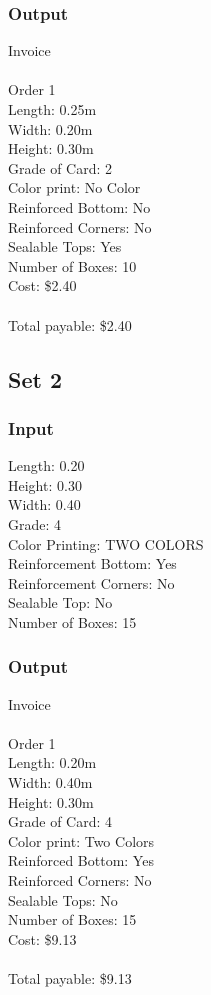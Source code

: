\documentclass[12pt]{article}
\begin{document}
\subsubsection{Output}
Invoice\\
\\
Order 1\\
Length: 0.25m\\
Width: 0.20m\\
Height: 0.30m\\
Grade of Card: 2\\
Color print: No Color\\
Reinforced Bottom: No\\
Reinforced Corners: No\\
Sealable Tops: Yes\\
Number of Boxes: 10\\
Cost: \$2.40\\
\\
Total payable: \$2.40\\
\subsection{Set 2}
\subsubsection{Input}
Length: 0.20\\
Height: 0.30\\
Width: 0.40\\
Grade: 4\\
Color Printing: TWO COLORS\\
Reinforcement Bottom: Yes\\
Reinforcement Corners: No\\
Sealable Top: No\\
Number of Boxes: 15\\
\subsubsection{Output}
Invoice\\
\\
Order 1\\
Length: 0.20m\\
Width: 0.40m\\
Height: 0.30m\\
Grade of Card: 4\\
Color print: Two Colors\\
Reinforced Bottom: Yes\\
Reinforced Corners: No\\
Sealable Tops: No\\
Number of Boxes: 15\\
Cost: \$9.13\\
\\
Total payable: \$9.13\\
\end{document}

